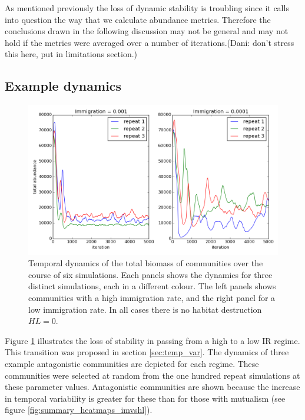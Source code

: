 \begin{itemize}
As mentioned previously the loss of dynamic stability is troubling since it calls into question the way that we calculate abundance metrics. Therefore the conclusions drawn in the following discussion may not be general and may not hold if the metrics were averaged over a number of iterations.(Dani: don't stress this here, put in limitations section.)
 
 
\newpage
\subsection{Example dynamics}
\label{sec:example_dynamics}

\begin{figure}[h!]
	\centering	
	\includegraphics[width=0.8\linewidth]{"./chapters/chapter04/figures/total_biomass_dynamics_hl_0_mai_0"}
	\caption{Temporal dynamics of the total biomass of communities over the course of six simulations. Each panels shows the dynamics for three distinct simulations, each in a different colour. The left panels shows communities with a high immigration rate, and the right panel for a low immigration rate. In all cases there is no habitat destruction $HL=0$.}
	\label{fig:total_biomass_dynamics}
\end{figure}


Figure \ref{fig:total_biomass_dynamics} illustrates the loss of stability in passing from a high to a low IR regime. This transition was proposed in section \ref{sec:temp_var}. The dynamics of three example antagonistic communities are depicted for each regime. These communities were selected at random from the one hundred repeat simulations at these parameter values. Antagonistic communities are shown because the increase in temporal variability is greater for these than for those with mutualism (see figure \ref{fig:summary_heatmaps_imvshl}). 


\end{itemize}
